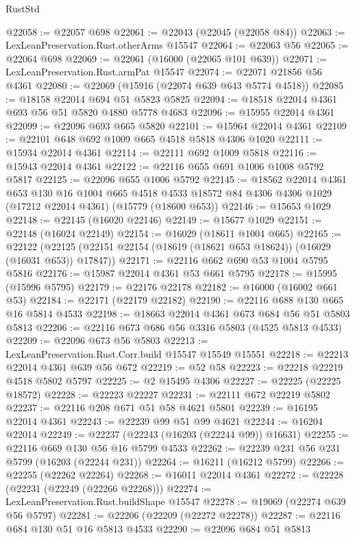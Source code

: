 \begin{lexlean}{RustStd}
\begin{coremodule}
@22058 := @22057 @698
@22061 := @22043 (@22045 (@22058 @84))
@22063 := LexLeanPreservation.Rust.otherArms @15547
@22064 := @22063 @56
@22065 := @22064 @698
@22069 := @22061 (@16000 (@22065 @101 @639))
@22071 := LexLeanPreservation.Rust.armPat @15547
@22074 := @22071 @21856 @56 @4361
@22080 := @22069 (@15916 (@22074 @639 @643 @5774 @4518))
@22085 := @18158 @22014 @694 @51 @5823 @5825
@22094 := @18518 @22014 @4361 @693 @56 @51 @5820 @4880 @5778 @4683
@22096 := @15955 @22014 @4361
@22099 := @22096 @693 @665 @5820
@22101 := @15964 @22014 @4361
@22109 := @22101 @648 @692 @1009 @665 @4518 @5818 @4306 @1020
@22111 := @15934 @22014 @4361
@22114 := @22111 @692 @1009 @5818
@22116 := @15943 @22014 @4361
@22122 := @22116 @655 @691 @1006 @1008 @5792 @5817
@22125 := @22096 @655 @1006 @5792
@22145 := @18562
    @22014
    @4361
    @653
    @130
    @16
    @1004
    @665
    @4518
    @4533
    @18572
    @84
    @4306
    @4306
    @1029
    (@17212 @22014 @4361)
    (@15779 (@18600 @653))
@22146 := @15653 @1029
@22148 := @22145 (@16020 @22146)
@22149 := @15677 @1029
@22151 := @22148 (@16024 @22149)
@22154 := @16029 (@18611 @1004 @665)
@22165 := @22122
    (@22125 (@22151 @22154 (@18619 (@18621 @653 @18624)) (@16029 (@16031 @653)) @17847))
@22171 := @22116 @662 @690 @53 @1004 @5795 @5816
@22176 := @15987 @22014 @4361 @53 @661 @5795
@22178 := @15995 (@15996 @5795)
@22179 := @22176 @22178
@22182 := @16000 (@16002 @661 @53)
@22184 := @22171 (@22179 @22182)
@22190 := @22116 @688 @130 @665 @16 @5814 @4533
@22198 := @18663 @22014 @4361 @673 @684 @56 @51 @5803 @5813
@22206 := @22116 @673 @686 @56 @3316 @5803 (@4525 @5813 @4533)
@22209 := @22096 @673 @56 @5803
@22213 := LexLeanPreservation.Rust.Corr.build @15547 @15549 @15551
@22218 := @22213 @22014 @4361 @639 @56 @672
@22219 := @52 @58
@22223 := @22218 @22219 @4518 @5802 @5797
@22225 := @2 @15495 @4306
@22227 := @22225 (@22225 @18572)
@22228 := @22223 @22227
@22231 := @22111 @672 @22219 @5802
@22237 := @22116 @208 @671 @51 @58 @4621 @5801
@22239 := @16195 @22014 @4361
@22243 := @22239 @99 @51 @99 @4621
@22244 := @16204 @22014
@22249 := @22237 (@22243 (@16203 (@22244 @99)) @16631)
@22255 := @22116 @669 @130 @56 @16 @5799 @4533
@22262 := @22239 @231 @56 @231 @5799 (@16203 (@22244 @231))
@22264 := @16211 (@16212 @5799)
@22266 := @22255 (@22262 @22264)
@22268 := @16011 @22014 @4361
@22272 := @22228 (@22231 (@22249 (@22266 @22268)))
@22274 := LexLeanPreservation.Rust.buildShape @15547
@22278 := @19069 (@22274 @639 @56 @5797)
@22281 := @22206 (@22209 (@22272 @22278))
@22287 := @22116 @684 @130 @51 @16 @5813 @4533
@22290 := @22096 @684 @51 @5813

\end{coremodule}
\end{lexlean}
